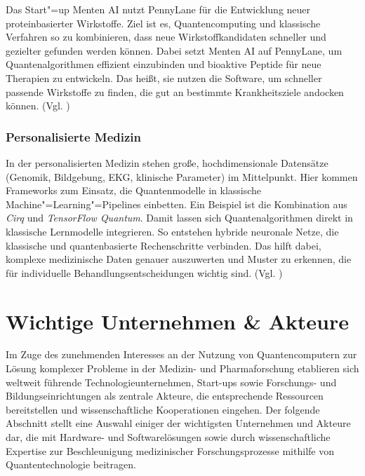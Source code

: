 Das Start"=up Menten AI nutzt PennyLane für die Entwicklung neuer proteinbasierter Wirkstoffe. Ziel ist es, Quantencomputing und klassische Verfahren so zu kombinieren, dass neue Wirkstoffkandidaten schneller und gezielter gefunden werden können. Dabei setzt Menten AI auf PennyLane, um Quantenalgorithmen effizient einzubinden und bioaktive Peptide für neue Therapien zu entwickeln. Das heißt, sie nutzen die Software, um schneller passende Wirkstoffe zu finden, die gut an bestimmte Krankheitsziele andocken können. (Vgl. \cite{xanadu2022})\\



\subsubsection*{Personalisierte Medizin}
In der personalisierten Medizin stehen große, hochdimensionale Datensätze (Genomik, Bildgebung, EKG, klinische Parameter) im Mittelpunkt. Hier kommen Frameworks zum Einsatz, die Quantenmodelle in klassische Machine"=Learning"=Pipelines einbetten. Ein Beispiel ist die Kombination aus \textit{Cirq} und \textit{TensorFlow Quantum}. Damit lassen sich Quantenalgorithmen direkt in klassische Lernmodelle integrieren. So entstehen hybride neuronale Netze, die klassische und quantenbasierte Rechenschritte verbinden. Das hilft dabei, komplexe medizinische Daten genauer auszuwerten und Muster zu erkennen, die für individuelle Behandlungsentscheidungen wichtig sind. (Vgl. \cite{tensorflowQuantum2020})

\section{Wichtige Unternehmen \& Akteure}
Im Zuge des zunehmenden Interesses an der Nutzung von Quantencomputern zur Lösung komplexer Probleme in der Medizin- und Pharmaforschung etablieren sich weltweit führende Technologieunternehmen, Start-ups sowie Forschungs- und Bildungseinrichtungen als zentrale Akteure, die entsprechende Ressourcen bereitstellen und wissenschaftliche Kooperationen eingehen. 
Der folgende Abschnitt stellt eine Auswahl einiger der wichtigsten Unternehmen und Akteure dar, die mit Hardware- und Softwarelösungen sowie durch wissenschaftliche Expertise zur Beschleunigung medizinischer Forschungsprozesse mithilfe von Quantentechnologie beitragen.\\

